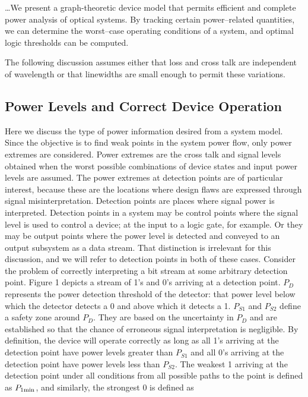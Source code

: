 \ldots We present a graph-theoretic device model that permits efficient and
complete power analysis of optical systems.  By tracking certain
power--related quantities, we can determine the worst--case operating
conditions of a system, and optimal logic thresholds can be computed.

The following discussion assumes either that loss and cross talk are
independent of wavelength or that linewidths are small enough to permit
these variations.

\subsection{Power Levels and Correct Device Operation}

Here we discuss the type of power information desired from a system model.
Since the objective is to find weak points in the system power flow, only
power extremes are considered.  Power extremes are the cross talk and
signal levels obtained when the worst possible combinations of device
states and input power levels are assumed.  The power extremes at detection
points are of particular interest, because these are the locations where
design flaws are expressed through signal misinterpretation.  Detection
points are places where signal power is interpreted.  Detection points in a
system may be control points where the signal level is used to control a
device; at the input to a logic gate, for example.  Or they may be output
points where the power level is detected and conveyed to an output
subsystem as a data stream.  That distinction is irrelevant for this
discussion, and we will refer to detection points in both of these cases. 
Consider the problem of correctly interpreting a bit stream at some
arbitrary detection point.  Figure 1 depicts a stream of 1's and 0's
arriving at a detection point.  $ P_D $ represents the power detection
threshold of the detector: that power level below which the detector
detects a 0 and above which it detects a 1.  $ P_{S1} $ and $ P_{S2} $
define a safety zone around $ P_D$.  They are based on the uncertainty in $
P_D$ and are established so that the chance of erroneous signal
interpretation is negligible.  By definition, the device will operate
correctly as long as all 1's arriving at the detection point have power
levels greater than $ P_{S1}$ and all 0's arriving at the detection point
have power levels less than $ P_{S2}$.  The weakest 1 arriving at the
detection point under all conditions from all possible paths to the point
is defined as $P_{1\rm min}$, and similarly, the strongest 0 is defined as
